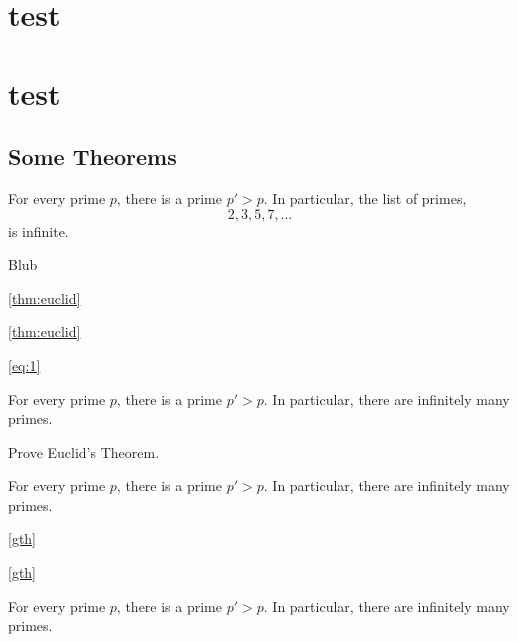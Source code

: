 \ifthmtools
\chapter{ test}
\else
\chapter{ test}
\fi

\section{Some Theorems} \label{mysec}

\begin{theorem}[name=Euclid,restate=firsteuclid]
\label{thm:euclid}%
For every prime $p$, there is a prime $p'>p$.
In particular, the list of primes,
\begin{equation}\label{eq:1}
2,3,5,7,\dots
\end{equation}
is infinite.
\end{theorem}

\begin{theorem}
\label{thm:blub}%
Blub
\end{theorem}

\autoref{thm:euclid}

\cref{thm:euclid}


\autoref{eq:1}

\begin{theoremS}[Euclid]
For every prime $p$, there is a prime $p'>p$.
In particular, there are infinitely many primes.
\end{theoremS}

\begin{exercise}
Prove Euclid’s Theorem.
\end{exercise}

\begin{lem}[label=gth]
For every prime $p$, there is a prime $p'>p$.
In particular, there are infinitely many primes.
\end{lem}

\autoref{gth}

\cref{gth}


\begin{euclid}
For every prime $p$, there is a prime $p'>p$.
In particular, there are infinitely many primes.
\end{euclid}

